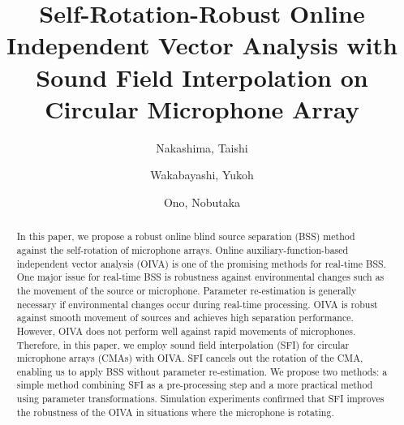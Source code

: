 \documentclass[sip,biber]{now-journal}
\title{Self-Rotation-Robust Online Independent Vector Analysis with\\Sound Field Interpolation on Circular Microphone Array}
\author{Nakashima, Taishi}
\affil{Tokyo Metropolitan University, Tokyo, Japan}
\author{Wakabayashi, Yukoh}
\affil{Toyohashi University of Technology, Aichi, Japan}
\author[1]{Ono, Nobutaka}
\begin{document}
\begin{abstract}
  In this paper, we propose a robust online blind source separation (BSS) method against the self-rotation of microphone arrays.
  Online auxiliary-function-based independent vector analysis (OIVA) is one of the promising methods for real-time BSS.
  One major issue for real-time BSS is robustness against environmental changes such as the movement of the source or microphone.
  Parameter re-estimation is generally necessary if environmental changes occur during real-time processing.
  OIVA is robust against smooth movement of sources and achieves high separation performance.
  However, OIVA does not perform well against rapid movements of microphones.
  Therefore, in this paper, we employ sound field interpolation (SFI) for circular microphone arrays (CMAs) with OIVA.
  SFI cancels out the rotation of the CMA, enabling us to apply BSS without parameter re-estimation.
  We propose two methods: a simple method combining SFI as a pre-processing step and a more practical method using parameter transformations. 
  Simulation experiments confirmed that SFI improves the robustness of the OIVA in situations where the microphone is rotating.
\end{abstract}
\end{document}
